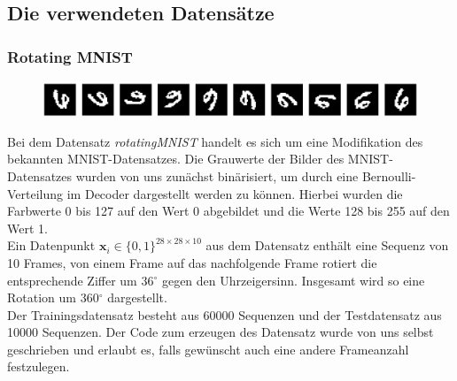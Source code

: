 \documentclass[12pt]{article}
\newcommand{\x}{\mathbf{x}_i}
\begin{document}
	\subsection[Datensätze]{Die verwendeten Datensätze}
	\subsubsection{Rotating MNIST}
	\begin{figure}[!htbp]
		\centering
		\includegraphics[scale=0.4]{rotatingMNIST}
	\end{figure}
	Bei dem Datensatz \emph{rotatingMNIST} handelt es sich um eine Modifikation des bekannten MNIST-Datensatzes. Die Grauwerte der Bilder
	des MNIST-Datensatzes wurden von uns zunächst binärisiert, um durch eine Bernoulli-Verteilung im Decoder dargestellt werden zu können.
	Hierbei wurden die Farbwerte 0 bis 127 auf den Wert 0 abgebildet und die Werte 128 bis 255 auf den Wert 1. \\
	Ein Datenpunkt $\x\in \{0,1\}^{28\times 28\times 10}$ aus dem Datensatz enthält eine Sequenz von 10 Frames, von einem Frame auf das nachfolgende Frame rotiert die entsprechende Ziffer um 36$^\circ$ gegen den Uhrzeigersinn. Insgesamt wird so eine Rotation um 360$^\circ$ dargestellt. \\
	Der Trainingsdatensatz besteht aus 60000 Sequenzen und der Testdatensatz aus 10000 Sequenzen. Der Code zum erzeugen des Datensatz wurde von uns selbst geschrieben und erlaubt es, falls gewünscht auch eine andere Frameanzahl festzulegen.
\end{document}
